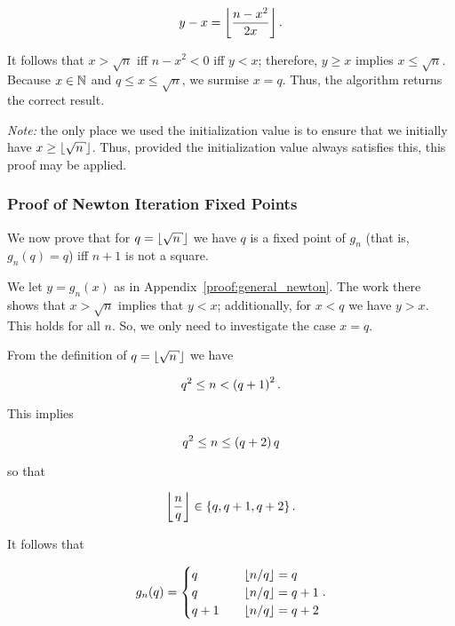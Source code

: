 \begin{equation}
    y - x = \left\lfloor \frac{n - x^{2}}{2x} \right\rfloor.
\end{equation}

\noindent
It follows that $x > \sqrt{n}$ iff $n - x^{2} < 0$ iff $y < x$;
therefore, $y\ge x$ implies $x \le \sqrt{n}$.
Because $x\in\mathbb{N}$ and $q\le x \le \sqrt{n}$, we surmise $x = q$.
Thus, the algorithm returns the correct result.

\emph{Note:} the only place we used the initialization value
is to ensure that we initially have $x \ge \floor{\sqrt{n}}$.
Thus, provided the initialization value always satisfies this,
this proof may be applied.

\subsubsection{Proof of Newton Iteration Fixed Points}
\label{proof:newton_fixed_points}

We now prove that for $q = \floor{\sqrt{n}}$ we have
$q$ is a fixed point of $g_{n}$ (that is, $g_{n}(q) = q$)
iff $n+1$ is not a square.

We let $y = g_{n}(x)$ as in Appendix~\ref{proof:general_newton}.
The work there shows that $x>\sqrt{n}$ implies that $y<x$;
additionally, for $x<q$ we have $y>x$.
This holds for all $n$.
So, we only need to investigate the case $x = q$.

From the definition of $q = \floor{\sqrt{n}}$ we have

\begin{equation}
    q^{2} \le n < \left( q+1 \right)^{2}.
\end{equation}

\noindent
This implies

\begin{equation}
    q^{2} \le n \le \left( q+2 \right)q
\end{equation}

\noindent
so that

\begin{equation}
    \left\lfloor \frac{n}{q} \right\rfloor\in\left\{ q, q+1, q+2 \right\}.
\end{equation}

\noindent
It follows that

\begin{equation}
    g_{n}(q) = \begin{cases}
        q &\quad \left\lfloor n/q \right\rfloor = q \\
        q &\quad \left\lfloor n/q \right\rfloor = q+1 \\
        q+1 &\quad \left\lfloor n/q \right\rfloor = q+2 \\
    \end{cases}.
\end{equation}

